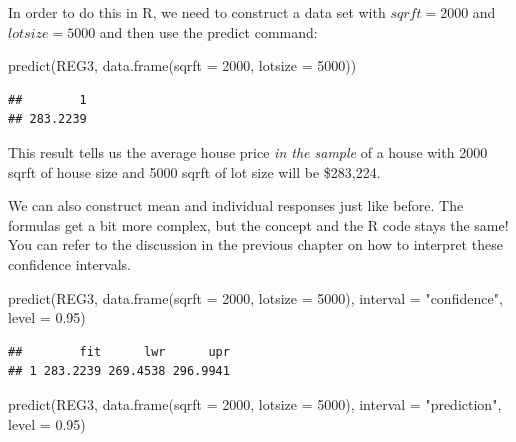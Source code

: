 \documentclass[
]{book}
\newenvironment{Shaded}{\begin{snugshade}}{\end{snugshade}}
\newcommand{\AttributeTok}[1]{\textcolor[rgb]{0.77,0.63,0.00}{#1}}
\newcommand{\DecValTok}[1]{\textcolor[rgb]{0.00,0.00,0.81}{#1}}
\newcommand{\FloatTok}[1]{\textcolor[rgb]{0.00,0.00,0.81}{#1}}
\newcommand{\FunctionTok}[1]{\textcolor[rgb]{0.00,0.00,0.00}{#1}}
\newcommand{\NormalTok}[1]{#1}
\newcommand{\StringTok}[1]{\textcolor[rgb]{0.31,0.60,0.02}{#1}}
\begin{document}
In order to do this in R, we need to construct a data set with \(sqrft = 2000\) and \(lotsize = 5000\) and then use the predict command:

\begin{Shaded}
\begin{Highlighting}[]
\FunctionTok{predict}\NormalTok{(REG3,}
        \FunctionTok{data.frame}\NormalTok{(}\AttributeTok{sqrft =} \DecValTok{2000}\NormalTok{, }\AttributeTok{lotsize =} \DecValTok{5000}\NormalTok{))}
\end{Highlighting}
\end{Shaded}

\begin{verbatim}
##        1 
## 283.2239
\end{verbatim}

This result tells us the average house price \emph{in the sample} of a house with 2000 sqrft of house size and 5000 sqrft of lot size will be \$283,224.

We can also construct mean and individual responses just like before. The formulas get a bit more complex, but the concept and the R code stays the same! You can refer to the discussion in the previous chapter on how to interpret these confidence intervals.

\begin{Shaded}
\begin{Highlighting}[]
\FunctionTok{predict}\NormalTok{(REG3,}
        \FunctionTok{data.frame}\NormalTok{(}\AttributeTok{sqrft =} \DecValTok{2000}\NormalTok{, }\AttributeTok{lotsize =} \DecValTok{5000}\NormalTok{),}
        \AttributeTok{interval =} \StringTok{"confidence"}\NormalTok{,}
        \AttributeTok{level =} \FloatTok{0.95}\NormalTok{)}
\end{Highlighting}
\end{Shaded}

\begin{verbatim}
##        fit      lwr      upr
## 1 283.2239 269.4538 296.9941
\end{verbatim}

\begin{Shaded}
\begin{Highlighting}[]
\FunctionTok{predict}\NormalTok{(REG3,}
        \FunctionTok{data.frame}\NormalTok{(}\AttributeTok{sqrft =} \DecValTok{2000}\NormalTok{, }\AttributeTok{lotsize =} \DecValTok{5000}\NormalTok{),}
        \AttributeTok{interval =} \StringTok{"prediction"}\NormalTok{,}
        \AttributeTok{level =} \FloatTok{0.95}\NormalTok{)}
\end{Highlighting}
\end{Shaded}
\end{document}
